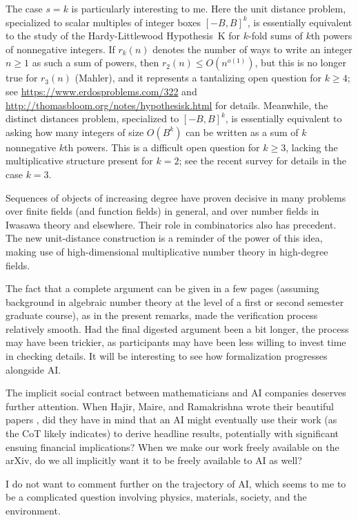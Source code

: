 \documentclass[11pt,reqno]{amsart}
\numberwithin{equation}{section}
\theoremstyle{definition}
\theoremstyle{remark}
\begin{document}
The case $s=k$ is particularly interesting to me.
Here the unit distance problem, specialized to scalar multiples of integer boxes $[-B,B]^k$, is essentially equivalent to the study of the Hardy-Littlewood Hypothesis~K for $k$-fold sums of $k$th powers of nonnegative integers.
If $r_k(n)$ denotes the number of ways to write an integer $n\ge 1$ as such a sum of powers, then $r_2(n) \le O(n^{o(1)})$, but this is no longer true for $r_3(n)$ (Mahler), and it represents a tantalizing open question for $k\ge 4$;
see \url{https://www.erdosproblems.com/322} and \url{http://thomasbloom.org/notes/hypothesisk.html} for details.
Meanwhile, the distinct distances problem, specialized to $[-B,B]^k$, is essentially equivalent to asking how many integers of size $O(B^k)$ can be written as a sum of $k$ nonnegative $k$th powers.
This is a difficult open question for $k\ge 3$, lacking the multiplicative structure present for $k=2$;
see the recent survey \cite{maynard2026sums} for details in the case $k=3$.

Sequences of objects of increasing degree have proven decisive in many problems over finite fields (and function fields) in general, and over number fields in Iwasawa theory and elsewhere.
Their role in combinatorics also has precedent.
The new unit-distance construction is a reminder of the power of this idea, making use of high-dimensional multiplicative number theory in high-degree fields.

The fact that a complete argument can be given in a few pages (assuming background in algebraic number theory at the level of a first or second semester graduate course), as in the present remarks, made the verification process relatively smooth.
Had the final digested argument been a bit longer, the process may have been trickier, as participants may have been less willing to invest time in checking details.
It will be interesting to see how formalization progresses alongside AI.

The implicit social contract between mathematicians and AI companies
deserves further attention.
When Hajir, Maire, and Ramakrishna wrote their beautiful papers
\cite{hajir2001asymptotically,hajir2021cutting},
did they have in mind that an AI might eventually use their work
(as the CoT likely indicates)
to derive headline results,
potentially with significant ensuing financial implications?
When we make our work freely available on the arXiv,
do we all implicitly want it to be freely available to AI as well?

I do not want to comment further on the trajectory of AI, which seems to me to be a complicated question involving physics, materials, society, and the environment.
\end{document}
